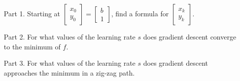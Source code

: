 \documentclass{article}
\begin{document}
\begin{itemize}
\begin{enumerate}
\medskip

\begin{enumerate}
\item[Part 1.] Starting at $\begin{bmatrix}x_0\\y_0\end{bmatrix} = \begin{bmatrix} b \\ 1 \end{bmatrix}$, find a formula for $\begin{bmatrix}x_k\\y_k\end{bmatrix}$.
\item[Part 2.] For what values of the learning rate $s$ does gradient descent converge to the minimum of $f$.
\item[Part 3.] For what values of the learning rate $s$ does gradient descent approaches the minimum in a zig-zag path.
\end{enumerate}

\end{enumerate}
\end{itemize}
\end{document}
